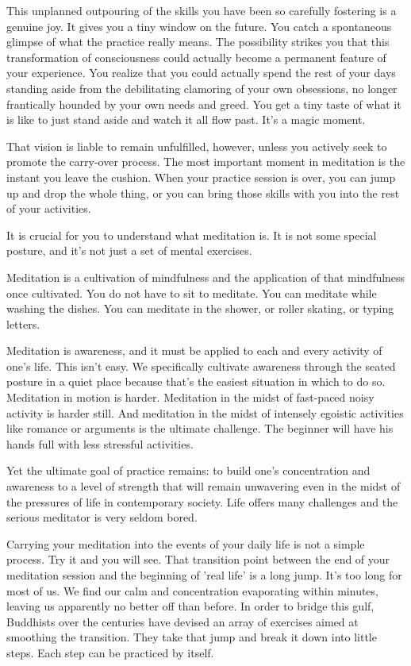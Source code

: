 This unplanned outpouring of the skills you have been so carefully fostering is
a genuine joy. It gives you a tiny window on the future. You catch a spontaneous
glimpse of what the practice really means. The possibility strikes you that this
transformation of consciousness could actually become a permanent feature of
your experience. You realize that you could actually spend the rest of your days
standing aside from the debilitating clamoring of your own obsessions, no longer
frantically hounded by your own needs and greed. You get a tiny taste of what it
is like to just stand aside and watch it all flow past. It's a magic moment.

That vision is liable to remain unfulfilled, however, unless you actively seek
to promote the carry-over process. The most important moment in meditation is
the instant you leave the cushion. When your practice session is over, you can
jump up and drop the whole thing, or you can bring those skills with you into
the rest of your activities.

It is crucial for you to understand what meditation is. It is not some special posture, and it's not just a set of mental exercises.

Meditation is a cultivation of mindfulness and the application of that
mindfulness once cultivated. You do not have to sit to meditate. You can
meditate while washing the dishes. You can meditate in the shower, or roller
skating, or typing letters.

Meditation is awareness, and it must be applied to each and every activity of
one's life. This isn't easy.
We specifically cultivate awareness through the seated posture in a quiet place because that's the easiest situation in which to do
so. Meditation in motion is harder. Meditation in the midst of fast-paced noisy activity is harder still. And meditation in the
midst of intensely egoistic activities like romance or arguments is the ultimate challenge. The beginner will have his hands full
with less stressful activities.

Yet the ultimate goal of practice remains: to build one's concentration and
awareness to a level of strength that will remain unwavering even in the midst
of the pressures of life in contemporary society. Life offers many challenges
and the serious meditator is very seldom bored.

Carrying your meditation into the events of your daily life is not a simple
process. Try it and you will see. That transition point between the end of your
meditation session and the beginning of 'real life' is a long jump. It's too
long for most of us. We find our calm and concentration evaporating within
minutes, leaving us apparently no better off than before. In order to bridge
this gulf, Buddhists over the centuries have devised an array of exercises aimed
at smoothing the transition. They take that jump and break it down into little
steps. Each step can be practiced by itself.

